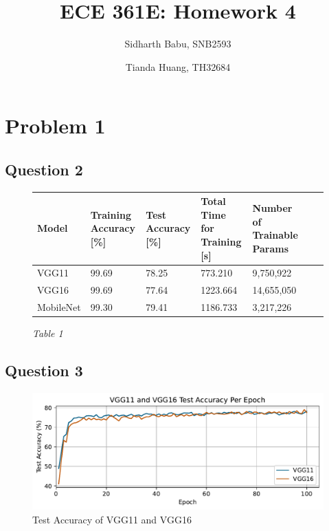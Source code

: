 \documentclass{article}
\author{Sidharth Babu, SNB2593 \and Tianda Huang, TH32684}
\title{ECE 361E: Homework 4}
\begin{document}
\begin{mdframed}
    \maketitle
\end{mdframed}
\pagebreak

\section*{Problem 1}
\subsection*{Question 2}
\begin{figure}[!htb]
    \caption{\textit{Table 1}}
    \begin{tabularx}{\textwidth}{|*{7}{Y|}}
        \hline
        Model       & Training Accuracy [\%] & Test Accuracy [\%] & Total Time for Training [s] & Number of Trainable Params\\
        \hline
        VGG11       & 99.69  & 78.25  & 773.210  & 9,750,922 \\
        \hline
        VGG16       & 99.69  & 77.64  & 1223.664 & 14,655,050\\
        \hline
        MobileNet   & 99.30  & 79.41  & 1186.733 & 3,217,226 \\
        \hline
    \end{tabularx}
    \label{fig:model-summary}
\end{figure}

\subsection*{Question 3}
\begin{figure}[!htb]
    \centering
    \includegraphics[width=\textwidth]{vgg11_16_acc.pdf}
    \caption{Test Accuracy of VGG11 and VGG16}
    \label{fig:vgg-epoch-accuracy}
\end{figure}
\end{document}
